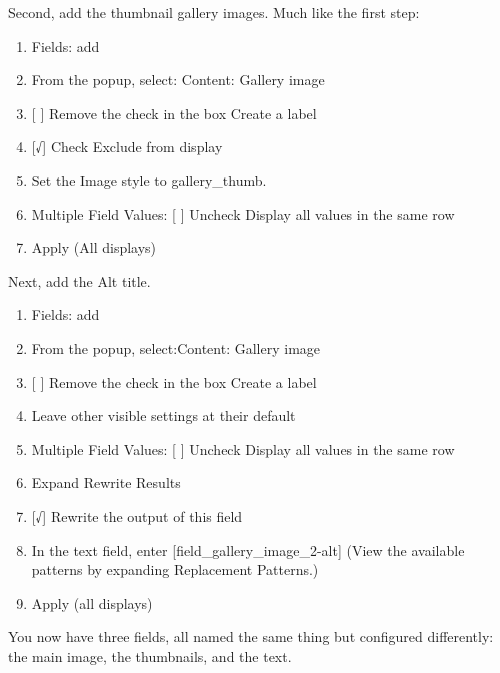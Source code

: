 \documentclass[letterpaper,10pt,english]{sphinxmanual}
\begin{document}
Second, add the thumbnail gallery images. Much like the first step:
\begin{enumerate}
\item {} 
Fields: add

\item {} 
From the popup, select: Content: Gallery image

\item {} 
{[} {]} Remove the check in the box Create a label

\item {} 
{[}√{]} Check Exclude from display

\item {} 
Set the Image style to gallery\_thumb.

\item {} 
Multiple Field Values: {[} {]} Uncheck Display all values in the same row

\item {} 
Apply (All displays)

\end{enumerate}

Next, add the Alt title.
\begin{enumerate}
\item {} 
Fields: add

\item {} 
From the popup, select:Content: Gallery image

\item {} 
{[} {]} Remove the check in the box Create a label

\item {} 
Leave other visible settings at their default

\item {} 
Multiple Field Values: {[} {]} Uncheck Display all values in the same row

\item {} 
Expand Rewrite Results

\item {} 
{[}√{]} Rewrite the output of this field

\item {} 
In the text field, enter {[}field\_gallery\_image\_2-alt{]} (View the available patterns by expanding Replacement Patterns.)

\item {} 
Apply (all displays)

\end{enumerate}

You now have three fields, all named the same thing but configured differently: the main image, the thumbnails, and the text.
\end{document}
